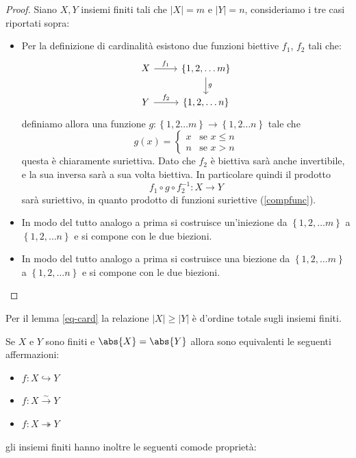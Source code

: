 \documentclass[11pt]{scrartcl}
\begin{document}
	\begin{proof}
		Siano $X,Y$ insiemi finiti tali che $|X|=m$ e $|Y|=n$, consideriamo i tre casi riportati sopra:
		\begin{itemize}
			\item[($m>n$)] Per la definizione di cardinalità esistono due funzioni biettive $f_1$, $f_2$ tali che:
			$$
			\begin{tikzcd}
				X \arrow{r}{f_1} & \left\{1,2,\dots m\right\} \arrow{d}{g} \\
				Y \arrow{r}{f_2}& \left\{1,2,\dots n\right\}
			\end{tikzcd}
			$$
			definiamo allora una funzione $g:\left\{1,2\dots m\right\}\to\left\{1,2\dots n\right\}$ tale che
			$$g(x)=
			\begin{cases}
				x & \text{se } x\le n\\
				n & \text{se } x>n 
			\end{cases}
			$$
			questa è chiaramente suriettiva. Dato che $f_2$ è biettiva sarà anche invertibile, e la sua inversa sarà a sua volta biettiva. In particolare quindi il prodotto 
			$$f_1\circ g \circ f_2^{-1}:X\to Y$$
			 sarà suriettivo, in quanto prodotto di funzioni suriettive (\ref{compfunc}).
			\item[($m<n$)] In modo del tutto analogo a prima si costruisce un'iniezione da $\left\{1,2,\dots m\right\}$ a $\left\{1,2,\dots n\right\}$ e si compone con le due biezioni. 
			\item[($m=n$)] In modo del tutto analogo a prima si costruisce una biezione da $\left\{1,2,\dots m\right\}$ a $\left\{1,2,\dots n\right\}$ e si compone con le due biezioni. 
		\end{itemize}
	\end{proof}
	
	\begin{remark}
		Per il lemma \ref{eq-card} la relazione $|X|\ge |Y|$ è d'ordine totale sugli insiemi finiti.
	\end{remark}
	\begin{remark}
		Se $X$ e $Y$ sono finiti e $\abs{X}=\abs{Y}$ allora sono equivalenti le seguenti affermazioni:
		\begin{itemize}
			\item $f:X\hookrightarrow Y$
			\item $f:X\xrightarrow{\sim} Y$
			\item $f:X\twoheadrightarrow Y$
		\end{itemize}
		\label{proprietà degli insiemi finiti}
	\end{remark}
	gli insiemi finiti hanno inoltre le seguenti comode proprietà:
	
\end{document}
